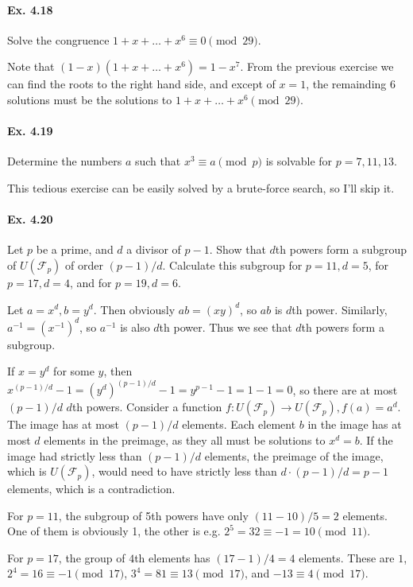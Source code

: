 \documentclass[notitlepage]{article}
\theoremstyle{definition}
\newcommand\F{\mathcal{F}}
\begin{document}
\paragraph{Ex. 4.18}
Solve the congruence $1 + x + \ldots + x^6 \equiv 0 \pmod {29}$.

Note that $(1-x)(1 + x + \ldots + x^6) = 1 - x^7$. From the previous
exercise we can find the roots to the right hand side, and except of
$x = 1$, the remainding $6$ solutions must be the solutions to $1 + x
+ \ldots + x^6 \pmod {29}$.

\paragraph{Ex. 4.19}
Determine the numbers $a$ such that $x^3 \equiv a \pmod {p}$ is
solvable for $p = 7, 11, 13$.

This tedious exercise can be easily solved by a brute-force search, so
I'll skip it.

\paragraph{Ex. 4.20}
Let $p$ be a prime, and $d$ a divisor of $p - 1$. Show that $d$th
powers form a subgroup of $U(\F_p)$ of order $(p-1)/d$. Calculate this
subgroup for $p = 11, d = 5$, for $p = 17, d = 4$, and for $p = 19, d
= 6$.

Let $a = x^d, b = y^d$. Then obviously $ab = (xy)^d$, so $ab$ is $d$th
power. Similarly, $a^{-1} = (x^{-1})^d$, so $a^{-1}$ is also $d$th
power. Thus we see that $d$th powers form a subgroup.

If $x = y^d$ for some $y$, then $x^{(p-1)/d} - 1 = (y^d)^{(p-1)/d} -1
= y^{p-1} - 1 = 1 - 1 = 0$, so there are at most $(p-1)/d$ $d$th
powers. Consider a function $f: U(\F_p) \to U(\F_p), f(a) = a^d$. The
image has at most $(p-1)/d$ elements. Each element $b$ in the image
has at most $d$ elements in the preimage, as they all must be
solutions to $x^d = b$. If the image had strictly less than $(p-1)/d$
elements, the preimage of the image, which is $U(\F_p)$, would need to
have strictly less than $d \cdot (p-1)/d = p-1$ elements, which is a
contradiction.

For $p = 11$, the subgroup of 5th powers have only $(11-10)/5 = 2$
elements. One of them is obviously 1, the other is e.g. $2^5 = 32
\equiv -1 = 10 \pmod {11}$.

For $p = 17$, the group of $4$th elements has $(17-1)/4 = 4$
elements. These are $1$, $2^4 = 16 \equiv -1 \pmod {17}$, $3^4 = 81
\equiv 13 \pmod {17}$, and $-13 \equiv 4 \pmod {17}$.
\end{document}
